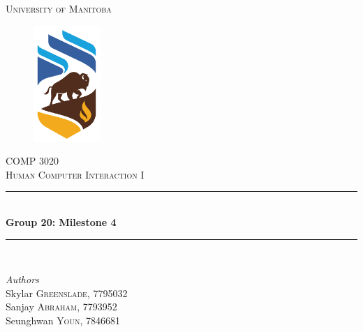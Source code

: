 \documentclass{article}
\begin{document}
\begin{titlepage} %
	\newcommand{\HRule}{\rule{\linewidth}{0.5mm}} %
	
	\center %
	
	
	\textsc{\LARGE University of Manitoba}\\[1.5cm] %
	
	\begin{figure}
	    \centering
	    \includegraphics[width=1in]{uofmlogo.png}
	    \label{fig:uofm}
	\end{figure}
	
	\textsc{\Large COMP 3020}\\[0.5cm] %
	
	\textsc{\large Human Computer Interaction I}\\[0.5cm] %
	
	
	\HRule\\[0.4cm]
	
	{\huge\bfseries Group 20: Milestone 4}\\[0.4cm] %
	
	\HRule\\[1.5cm]
	
	
	\begin{minipage}{0.4\textwidth}
		\begin{flushleft}
			\large
			\textit{Authors}\\
			Skylar \textsc{Greenslade}, 7795032\\
			Sanjay \textsc{Abraham}, 7793952\\
			Seunghwan \textsc{Youn}, 7846681
			

\end{flushleft}
\end{minipage}
\end{titlepage}
\end{document}
